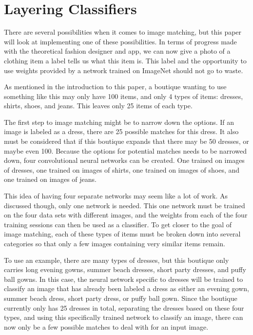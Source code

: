 \documentclass[12pt]{report} %
\begin{document}
\section{Layering Classifiers}
	There are several possibilities when it comes to image matching, but this paper will look at implementing one of these possibilities. In terms of progress made with the theoretical fashion designer and app, we can now give a photo of a clothing item a label tells us what this item is. This label and the opportunity to use weights provided by a network trained on ImageNet should not go to waste.
	
	As mentioned in the introduction to this paper, a boutique wanting to use something like this may only have 100 items, and only 4 types of items: dresses, shirts, shoes, and jeans. This leaves only 25 items of each type. 
	
	The first step to image matching might be to narrow down the options. If an image is labeled as a dress, there are 25 possible matches for this dress. It also must be considered that if this boutique expands that there may be 50 dresses, or maybe even 100.  Because the options for potential matches needs to be narrowed down, four convolutional neural networks can be created. One trained on images of dresses, one trained on images of shirts, one trained on images of shoes, and one trained on images of jeans.
	
	This idea of having four separate networks may seem like a lot of work. As discussed though, only one network is needed. This one network must be trained on the four data sets with different images, and the weights from each of the four training sessions can then be used as a classifier. To get closer to the goal of image matching, each of these types of items must be broken down into several categories so that only a few images containing very similar items remain. 
	
	To use an example, there are many types of dresses, but this boutique only carries long evening gowns, summer beach dresses, short party dresses, and puffy ball gowns. In this case, the neural network specific to dresses will be trained to classify an image that has already been labeled a dress as either an evening gown, summer beach dress, short party dress, or puffy ball gown. Since the boutique currently only has 25 dresses in total, separating the dresses based on these four types, and using this specifically trained network to classify an image, there can now only be a few possible matches to deal with for an input image. 
\end{document}
